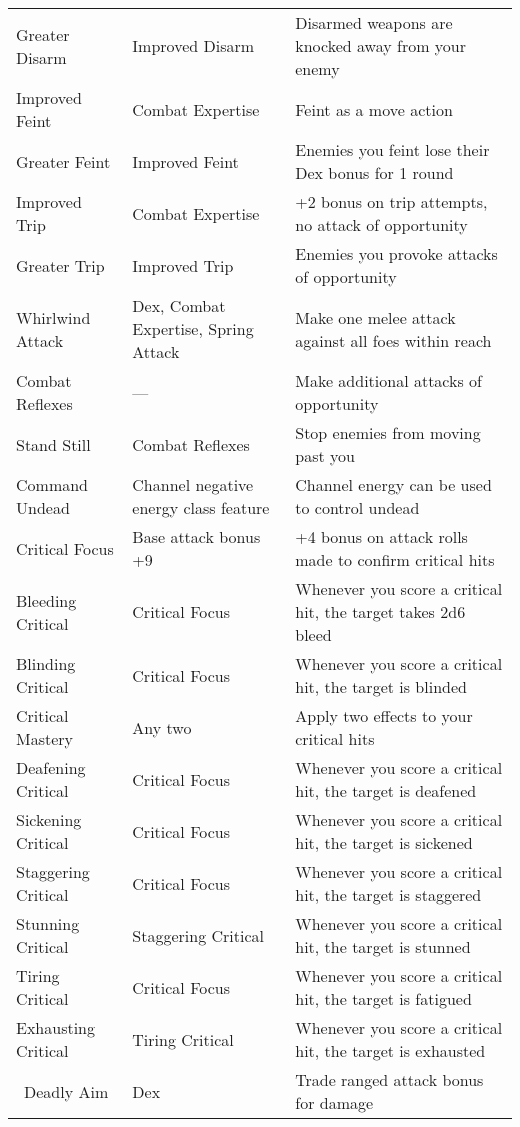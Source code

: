 \begin{table}[]
\begin{tabular}{lll}
\quad \quad Greater Disarm & Improved Disarm & Disarmed weapons are knocked away from your enemy\\
\quad Improved Feint & Combat Expertise & Feint as a move action\\
\quad \quad Greater Feint & Improved Feint & Enemies you feint lose their Dex bonus for 1 round \\
\quad Improved Trip & Combat Expertise & +2 bonus on trip attempts, no attack of opportunity\\
\quad \quad Greater Trip & Improved Trip & Enemies you provoke attacks of opportunity\\
\quad Whirlwind Attack & Dex, Combat Expertise, Spring Attack & Make one melee attack against all foes within reach\\
Combat Reflexes & — & Make additional attacks of opportunity\\
\quad Stand Still & Combat Reflexes & Stop enemies from moving past you\\
Command Undead & Channel negative energy class feature & Channel energy can be used to control undead\\
Critical Focus & Base attack bonus +9 & +4 bonus on attack rolls made to confirm critical hits\\
\quad Bleeding Critical & Critical Focus & Whenever you score a critical hit, the target takes 2d6 bleed \\
\quad Blinding Critical & Critical Focus & Whenever you score a critical hit, the target is blinded\\
\quad Critical Mastery & Any two  & Apply two effects to your critical hits\\
\quad Deafening Critical & Critical Focus & Whenever you score a critical hit, the target is deafened\\
\quad Sickening Critical & Critical Focus & Whenever you score a critical hit, the target is sickened\\
\quad Staggering Critical & Critical Focus & Whenever you score a critical hit, the target is staggered\\
\quad Stunning Critical & Staggering Critical & Whenever you score a critical hit, the target is stunned\\
\quad Tiring Critical & Critical Focus & Whenever you score a critical hit, the target is fatigued\\
\quad \quad Exhausting Critical & Tiring Critical & Whenever you score a critical hit, the target is exhausted\\\
Deadly Aim & Dex & Trade ranged attack bonus for damage\\

\end{tabular}
\end{table}
